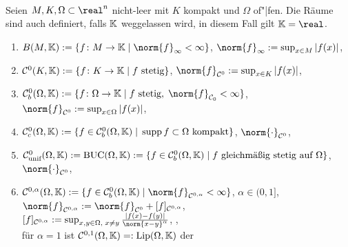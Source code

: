 \begin{Bsp}
    \\
    Seien $M, K, \Omega \subset \real^n$ nicht-leer mit $K$ kompakt und $\Omega$ of"|fen.
    Die Räume sind auch definiert, falls $\mathbb{K}$ weggelassen wird, in diesem Fall gilt
    $\KK = \real$.
    \begin{enumerate}[label=\emph{(\alph*)}]
        \item
        $B(M, \KK) := \{f\colon M \rightarrow \KK \;|\; \norm{f}_\infty < \infty\}$,
        $\norm{f}_\infty := \sup_{x \in M} |f(x)|$,\\

        \item
        $\mathcal{C}^0(K, \mathbb{K}) := \{f\colon K \rightarrow \mathbb{K} \;|\; f \text{ stetig}\}$,
        $\norm{f}_{\C^0} := \sup_{x \in K} |f(x)|$,\\

        \item
        $\C^0_b(\Omega, \KK) := \{f\colon \Omega \rightarrow \KK \;|\; f \text{ stetig},\;
        \norm{f}_{\C_0} < \infty\}$,
        $\norm{f}_{\C^0} := \sup_{x \in \Omega} |f(x)|$,\\

        \item
        $\mathcal{C}^0_c(\Omega, \mathbb{K}) := \{f \in \mathcal{C}^0_b(\Omega, \mathbb{K}) \;|\;
        \operatorname{supp} f \subset \Omega \text{ kompakt}\}$,
        $\norm{\cdot}_{\C^0}$,\\

        \item
        $\mathcal{C}^0_{\text{unif}}(\Omega, \mathbb{K}) := \text{BUC}(\Omega, \mathbb{K}) := \{f \in \mathcal{C}^0_b(\Omega, \mathbb{K}) \;|\;
        f \text{ gleichmäßig stetig auf } \Omega\}$,
        $\norm{\cdot}_{\C^0}$,\\

        \item
        $\C^{0,\alpha}(\Omega, \KK) := \{f \in \C^0_b(\Omega, \KK) \;|\;
        \norm{f}_{\C^{0,\alpha}} < \infty\}$, $\alpha \in (0, 1]$,
        $\norm{f}_{\C^{0,\alpha}} := \norm{f}_{\C^0} + [f]_{\C^{0,\alpha}}$,\\
        $[f]_{\C^{0,\alpha}} := \sup_{x, y \in \Omega,\; x \not= y}
        \frac{|f(x) - f(y)|}{\norm{x - y}^\alpha}$,
        ,\\
        für $\alpha = 1$ ist
        $\mathcal{C}^{0,1}(\Omega, \mathbb{K}) =: \text{Lip}(\Omega, \mathbb{K})$
        der 


\end{enumerate}
\end{Bsp}
